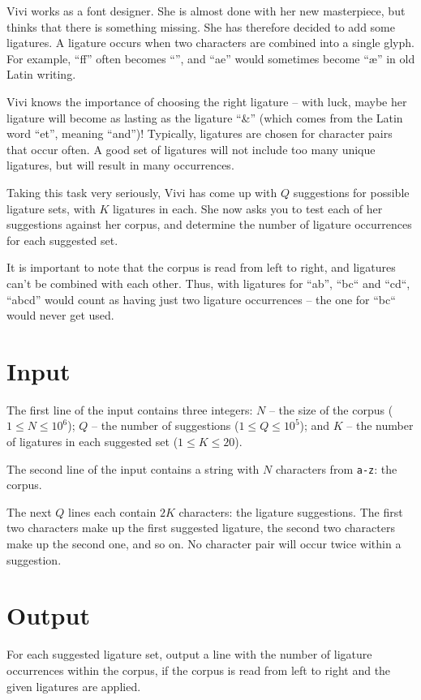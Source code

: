 Vivi works as a font designer.
She is almost done with her new masterpiece, but thinks that there is something missing.
She has therefore decided to add some ligatures.
A ligature occurs when two characters are combined into a single glyph.
For example, ``f{}f'' often becomes ``\fi'', and ``ae'' would sometimes become ``æ'' in old Latin writing.

Vivi knows the importance of choosing the right ligature -- with luck,
maybe her ligature will become as lasting as the ligature ``\&'' (which comes from the Latin word ``et'', meaning ``and'')!
Typically, ligatures are chosen for character pairs that occur often.
A good set of ligatures will not include too many unique ligatures, but will result in many occurrences.

Taking this task very seriously, Vivi has come up with $Q$ suggestions for possible ligature sets, with $K$ ligatures in each.
She now asks you to test each of her suggestions against her corpus, and determine the number of ligature occurrences for each suggested set.

It is important to note that the corpus is read from left to right, and ligatures can't be combined with each other.
Thus, with ligatures for ``ab'', ``bc`` and ``cd``, ``abcd'' would count as having just two ligature occurrences -- the one for ``bc`` would never get used.

\section*{Input}
The first line of the input contains three integers:
  $N$ -- the size of the corpus ($1 \le N \le 10^6$);
  $Q$ -- the number of suggestions ($1 \le Q \le 10^5$); and
  $K$ -- the number of ligatures in each suggested set ($1 \le K \le 20$).

The second line of the input contains a string with $N$ characters from \texttt{a-z}: the corpus.

The next $Q$ lines each contain $2K$ characters: the ligature suggestions.
The first two characters make up the first suggested ligature, the second two characters make up the second one, and so on.
No character pair will occur twice within a suggestion.

\section*{Output}
For each suggested ligature set, output a line with the number of ligature occurrences within the corpus,
if the corpus is read from left to right and the given ligatures are applied.

